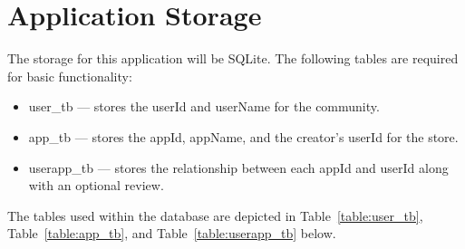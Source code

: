 \documentclass{article}
\begin{document}
\section{Application Storage}
The storage for this application will be SQLite.
The following tables are required for basic functionality:
\begin{itemize}
    \item{user\_tb}
        --- stores the userId and userName for the community.
    \item{app\_tb}
        --- stores the appId, appName, and the creator's userId for the store.
    \item{userapp\_tb}
        --- stores the relationship between each appId and userId along with an optional review.
\end{itemize}
The tables used within the database are depicted in Table~\ref{table:user_tb}, Table~\ref{table:app_tb}, and Table~\ref{table:userapp_tb} below.
\end{document}
